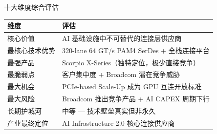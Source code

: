 \documentclass[aspectratio=169, 10pt, UTF8]{ctexbeamer}
\begin{document}
\begin{frame}{十大维度综合评估}
  \begin{table}[h]
    \centering
    \begin{tabular}{lp{}}
      \toprule
      \textbf{维度} & \textbf{评估} \\
      \midrule
      \rowcolor{ieeeGreen!10}
      核心价值 & AI 基础设施中不可替代的连接层供应商 \\
      \rowcolor{ieeeGreen!10}
      最核心技术优势 & 320-lane 64 GT/s PAM4 SerDes + 全栈连接平台 \\
      \rowcolor{ieeeGreen!5}
      最强产品 & Scorpio X-Series（独特定位，极少直接竞争）\\
      \rowcolor{ieeeOrange!10}
      最脆弱点 & 客户集中度 + Broadcom 潜在竞争威胁 \\
      \rowcolor{ieeeGreen!5}
      最大机会 & PCIe-based Scale-Up 成为 GPU 互连开放标准 \\
      \rowcolor{ieeeRed!10}
      最大风险 & Broadcom 推出竞争产品 + AI CAPEX 周期下行 \\
      \rowcolor{ieeeOrange!15}
      长期护城河 & 中等 — 技术壁垒真实但非永久 \\
      \rowcolor{ieeeBlue!8}
      产业最终定位 & AI Infrastructure 2.0 核心连接供应商 \\
      \bottomrule
    \end{tabular}
  \end{table}
\end{frame}
\end{document}

